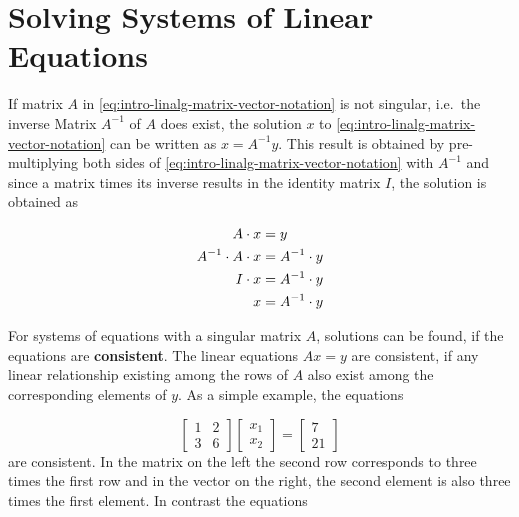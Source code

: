 \documentclass[
]{book}
\theoremstyle{definition}
\theoremstyle{definition}
\theoremstyle{definition}
\theoremstyle{remark}
\begin{document}
\hypertarget{intro-linalg-solving-systems-of-linear-equations}{%
\section{Solving Systems of Linear Equations}\label{intro-linalg-solving-systems-of-linear-equations}}

If matrix \(A\) in \eqref{eq:intro-linalg-matrix-vector-notation} is not singular, i.e.~the inverse Matrix \(A^{-1}\) of \(A\) does exist, the solution \(x\) to \eqref{eq:intro-linalg-matrix-vector-notation} can be written as \(x = A^{-1}y\). This result is obtained by pre-multiplying both sides of \eqref{eq:intro-linalg-matrix-vector-notation} with \(A^{-1}\) and since a matrix times its inverse results in the identity matrix \(I\), the solution is obtained as

\begin{align}
            A \cdot x  &=  y \notag \\
A^{-1}\cdot A \cdot x  &=  A^{-1} \cdot y \notag \\
            I \cdot x  &=  A^{-1} \cdot y \notag \\
                    x  &=  A^{-1} \cdot y
\label{eq:intro-linalg-matrix-vector-notation-solution-derivation}
\end{align}

For systems of equations with a singular matrix \(A\), solutions can be found, if the equations are \textbf{consistent}. The linear equations \(Ax = y\) are consistent, if any linear relationship existing among the rows of \(A\) also exist among the corresponding elements of \(y\). As a simple example, the equations

\[
\left[
\begin{array}{cc}
1  &  2  \\
3  &  6
\end{array}\right]
\left[
\begin{array}{c}
x_1  \\
x_2
\end{array}\right]
=
\left[
\begin{array}{c}
7  \\
21
\end{array}\right]
\]
are consistent. In the matrix on the left the second row corresponds to three times the first row and in the vector on the right, the second element is also three times the first element. In contrast the equations
\end{document}
